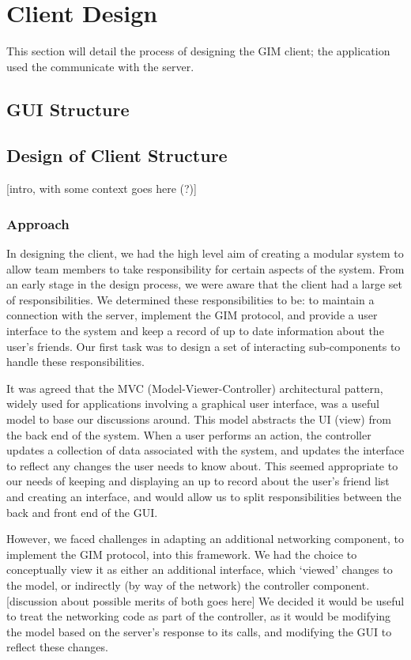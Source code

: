 \section{Client Design}

This section will detail the process of designing the GIM client; the application used the communicate with the server.

\subsection{GUI Structure}
\subsection{Design of Client Structure}

[intro, with some context goes here (?)]

\subsubsection{Approach}

In designing the client, we had the high level aim of creating a modular system to allow team members to take responsibility for certain aspects of the system. From an early stage in the design process, we were aware that the client had a large set of responsibilities. We determined these responsibilities to be: to maintain a connection with the server, implement the GIM protocol, and provide a user interface to the system and keep a record of up to date information about the user's friends. Our first task was to design a set of interacting sub-components to handle these responsibilities.

It was agreed that the MVC (Model-Viewer-Controller) architectural pattern, widely used for applications involving a graphical user interface, was a useful model to base our discussions around. This model abstracts the UI (view) from the back end of the system. When a user performs an action, the controller updates a collection of data associated with the system, and updates the interface to reflect any changes the user needs to know about. This seemed appropriate to our needs of keeping and displaying an up to record about the user's friend list and creating an interface, and would allow us to split responsibilities between the back and front end of the GUI. 

However, we faced challenges in adapting an additional networking component, to implement the GIM protocol, into this framework. We had the choice to conceptually view it as either an additional interface, which `viewed' changes to the model, or indirectly (by way of the network) the controller component. [discussion about possible merits of both goes here] We decided it would be useful to treat the networking code as part of the controller, as it would be modifying the model based on the server's response to its calls, and modifying the GUI to reflect these changes.
	
